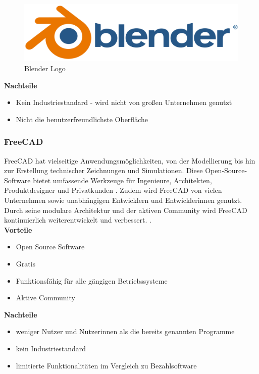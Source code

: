 \begin{figure}[H]
	\centering
	\includegraphics[width=0.3\linewidth]{images/Logo_Blender.png}
	\caption[Blender Logo]{Blender Logo}
	\label{fig:Blender}
\end{figure}


\textbf{Nachteile}
\begin{itemize}
	\item Kein Industriestandard - wird nicht von großen Unternehmen genutzt
	\item Nicht die benutzerfreundlichste Oberfläche \parencite{BlenderProsUndCons}
\end{itemize}



\subsubsection{FreeCAD}
FreeCAD hat vielseitige Anwendungsmöglichkeiten, von der Modellierung bis hin zur Erstellung technischer Zeichnungen und Simulationen. Diese Open-Source-Software bietet umfassende Werkzeuge für Ingenieure, Architekten, Produktdesigner und Privatkunden \parencite{FreeCAD}. Zudem wird FreeCAD von vielen Unternehmen sowie unabhängigen Entwicklern und Entwicklerinnen genutzt. Durch seine modulare Architektur und der aktiven Community wird FreeCAD kontinuierlich weiterentwickelt und verbessert.   \parencite{FreeCAD2}. \\


\textbf{Vorteile}
\begin{itemize}
	\item Open Source Software
	\item Gratis
	\item Funktionsfähig für alle gängigen Betriebssysteme
	\item Aktive Community \parencite{FreeCADReviews}
\end{itemize}

\textbf{Nachteile}
\begin{itemize}
	\item weniger Nutzer und Nutzerinnen als die bereits genannten Programme
	\item kein Industriestandard
	\item limitierte Funktionalitäten im Vergleich zu Bezahlsoftware \parencite{FreeCADReviews}
\end{itemize}

